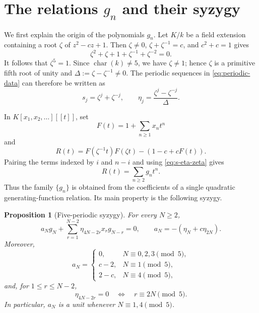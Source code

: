 \documentclass[11pt,reqno]{amsart}
\newtheorem{proposition}[theorem]{Proposition}
\theoremstyle{definition}
\theoremstyle{remark}
\theoremstyle{plain}
\begin{document}
\section{The relations \(g_n\) and their syzygy}\label{sec:syzygy}


We first explain the origin of the polynomials \(g_n\).  Let \(K/k\)
be a field extension containing a root \(\zeta\) of \(z^2-cz+1\).
Then \(\zeta\neq0\), \(\zeta+\zeta^{-1}=c\), and \(c^2+c=1\) gives
\[
  \zeta^2+\zeta+1+\zeta^{-1}+\zeta^{-2}=0.
\]
It follows that \(\zeta^5=1\).  Since
\(\operatorname{char}(k)\neq5\), we have \(\zeta\neq1\); hence
\(\zeta\) is a primitive fifth root of unity and
\(\Delta:=\zeta-\zeta^{-1}\neq0\).  The periodic sequences in
\eqref{eq:periodic-data} can therefore be written as
\begin{equation}\label{eq:s-eta-zeta}
  s_j=\zeta^j+\zeta^{-j},
  \qquad
  \eta_j=\frac{\zeta^j-\zeta^{-j}}{\Delta}.
\end{equation}

In \(K[x_1,x_2,\ldots][[t]]\), set
\[
  F(t)=1+\sum_{n\geq1}x_nt^n
\]
and 
\begin{equation}\label{eq:R-series}
  R(t)=F(\zeta^{-1}t)F(\zeta t)-(1-c+cF(t)).
\end{equation}
Pairing the terms indexed by \(i\) and \(n-i\) and using
\eqref{eq:s-eta-zeta} gives
\begin{equation}\label{eq:R-coefficients}
  R(t)=\sum_{n\geq2}g_nt^n.
\end{equation}
Thus the family \(\{g_n\}\) is obtained from the coefficients of a
single quadratic generating-function relation.  Its main property is
the following syzygy.

\begin{proposition}[Five-periodic syzygy]\label{prop:syzygy}
For every \(N\geq2\),
\begin{equation}\label{eq:five-periodic-syzygy}
  a_Ng_N+
  \sum_{r=1}^{N-2}\eta_{4N-2r}x_rg_{N-r}=0,
  \qquad
  a_N=-(\eta_N+c\eta_{2N}).
\end{equation}
Moreover,
\begin{equation}\label{eq:aN-values}
  a_N=
  \begin{cases}
    0,&N\equiv0,2,3\pmod5,\\
    c-2,&N\equiv1\pmod5,\\
    2-c,&N\equiv4\pmod5,
  \end{cases}
\end{equation}
and, for \(1\leq r\leq N-2\),
\begin{equation}\label{eq:eta-vanishing}
  \eta_{4N-2r}=0
  \quad\Longleftrightarrow\quad
  r\equiv2N\pmod5.
\end{equation}
In particular, \(a_N\) is a unit whenever
\(N\equiv1,4\pmod5\).
\end{proposition}
\end{document}

